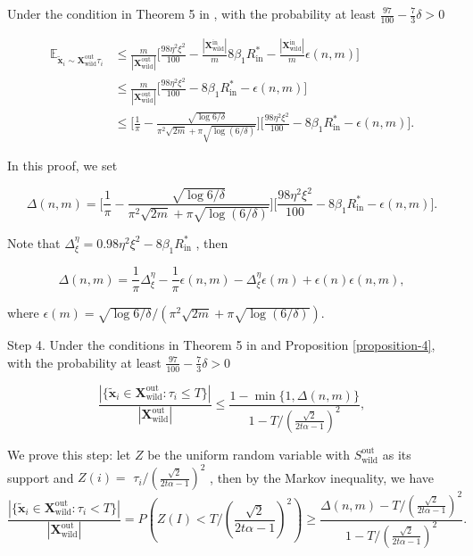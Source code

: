 Under the condition in Theorem 5 in \citep{du2024does}, with the probability at least $\frac{97}{100}-\frac{7}{3}\delta>0$

$$\begin{aligned}
\mathbb{E}_{\tilde{\mathbf{x}}_{i}\sim\boldsymbol{X}_{\mathrm{wild}}^{\mathrm{out}}\tau_{i}}& \leq\frac{m}{|\boldsymbol{X}_{\mathrm{wild}}^{\mathrm{out}}|}\big[\frac{98\eta^{2}\xi^{2}}{100}-\frac{|\boldsymbol{X}_{\mathrm{wild}}^{\mathrm{in}}|}{m}8\beta_{1}R_{\mathrm{in}}^{*}-\frac{|\boldsymbol{X}_{\mathrm{wild}}^{\mathrm{in}}|}{m}\epsilon(n,m)\big]  \\
&\leq\frac{m}{|\boldsymbol{X}_{\mathrm{wild}}^{\mathrm{out}}|}\big[\frac{98\eta^{2}\xi^{2}}{100}-8\beta_{1}R_{\mathrm{in}}^{*}-\epsilon(n,m)\big] \\
&\leq[\frac{1}{\pi}-\frac{\sqrt{\log6/\delta}}{\pi^{2}\sqrt{2m}+\pi\sqrt{\log(6/\delta)}}\Big]\Big[\frac{98\eta^{2}\xi^{2}}{100}-8\beta_{1}R_{\mathrm{in}}^{*}-\epsilon(n,m)\Big].
\end{aligned}$$

In this proof, we set

$$\Delta(n,m)=\big[\frac{1}{\pi}-\frac{\sqrt{\log6/\delta}}{\pi^2\sqrt{2m}+\pi\sqrt{\log(6/\delta)}}\big]\big[\frac{98\eta^2\xi^2}{100}-8\beta_1R_{\mathrm{in}}^*-\epsilon(n,m)\big].$$

Note that $\Delta_{\xi}^{\eta}=0.98\eta^{2}\xi^{2}-8\beta_{1}R_{\mathrm{in}}^{*}$ , then

$$\Delta(n,m)=\frac{1}{\pi}\Delta_{\xi}^{\eta}-\frac{1}{\pi}\epsilon(n,m)-\Delta_{\xi}^{\eta}\epsilon(m)+\epsilon(n)\epsilon(n,m),$$

where $\epsilon(m)=\sqrt{\log6/\delta}/(\pi^{2}\sqrt{2m}+\pi\sqrt{\log(6/\delta)}).$

Step 4. Under the conditions in Theorem 5 in \citep{du2024does} and Proposition \ref{proposition-4}, with the probability at least $\frac{97}{100}-\frac{7}{3}\delta>0$

\begin{equation}
\frac{|\{\tilde{\mathbf{x}}_{i}\in\boldsymbol{X}_{\mathrm{wild}}^{\mathrm{out}}:\tau_{i}\leq T\}|}{|\boldsymbol{X}_{\mathrm{wild}}^{\mathrm{out}}|}\leq\frac{1-\min\{1,\Delta(n,m)\}}{1 -T/(\frac{\sqrt{2}}{2t\alpha - 1})^2},
\end{equation}


We prove this step: let $Z$ be the uniform random variable with $S_{\mathrm{wild}}^{\mathrm{out}}$ as its support and $Z(i)=$ $\tau_{i}/(\frac{\sqrt{2}}{2t\alpha - 1})^2$ , then by the Markov inequality, we have
\begin{equation}
\frac{|\{\tilde{\mathbf{x}}_{i}\in \boldsymbol{X}_{\mathrm{wild}}^{\mathrm{out}}:\tau_{i}<T\}|}{|\boldsymbol{X}_{\mathrm{wild}}^{\mathrm{out}}|}=P(Z(I)<T/(\frac{\sqrt{2}}{2t\alpha - 1})^2)\geq\frac{\Delta(n,m)-T/(\frac{\sqrt{2}}{2t\alpha - 1})^2}{1-T/(\frac{\sqrt{2}}{2t\alpha - 1})^2}.
\end{equation}



